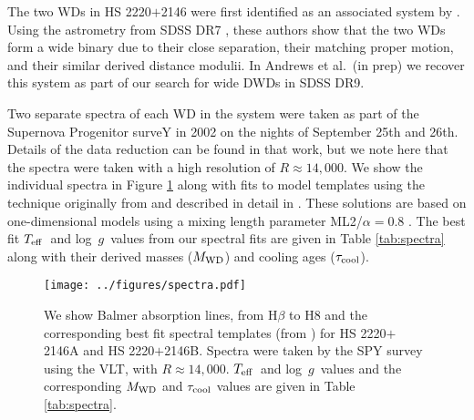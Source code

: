 \documentclass{emulateapj}
\newcommand{\Teff}{\ifmmode {T_{\rm eff} }\else $T_{\rm eff}$\fi}
\newcommand{\logg}{\ifmmode {{\rm log}\ g }\else log~$g$\fi}
\begin{document}
The two WDs in HS 2220$+$2146 were first identified as an associated system by \citet{baxter14}. Using the astrometry from SDSS DR7 \citep{DR7paper}, these authors show that the two WDs form a wide binary due to their close separation, their matching proper motion, and their similar derived distance modulii. In Andrews et al.\ (in prep) we recover this system as part of our search for wide DWDs in SDSS DR9. 

Two separate spectra of each WD in the system were taken as part of the Supernova Progenitor surveY \citep[SPY;][]{koester09} in 2002 on the nights of September 25th and 26th. Details of the data reduction can be found in that work, but we note here that the spectra were taken with a high resolution of $R \approx 14,000$. We show the individual spectra in Figure \ref{fig:spectra} along with fits to model templates using the technique originally from \citet{bergeron92} and described in detail in \citet[][and references therein]{gianninas11}. These solutions are based on one-dimensional models using a mixing length parameter ML2/$\alpha = 0.8$ \citep{tremblay10, tremblay11}. The best fit \Teff\ and \logg\ values from our spectral fits are given in Table \ref{tab:spectra} along with their derived masses ($M_{\rm WD}$) and cooling ages ($\tau_{\rm cool}$).

\begin{figure}
\begin{center}
\texttt{[image: ../figures/spectra.pdf]}
\caption{ We show Balmer absorption lines, from H$\beta$ to H8 and the corresponding best fit spectral templates (from \citet{tremblay11}) for HS 2220$+$2146A and HS 2220$+$2146B. Spectra were taken by the SPY survey using the VLT, with $R \approx 14,000$. \Teff\ and \logg\ values and the corresponding $M_{\rm WD}$ and $\tau_{\rm cool}$ values are given in Table \ref{tab:spectra}.}
\label{fig:spectra}
\end{center}
\end{figure}
\end{document}
